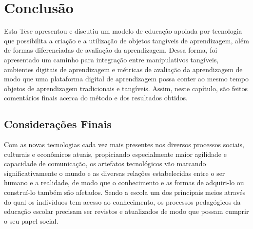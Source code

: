 
\chapter{Conclusão} \label{Chap:endFuture}


Esta Tese apresentou e discutiu um modelo de educação apoiada por tecnologia que possibilita a criação e a utilização de objetos tangíveis de aprendizagem, além de formas diferenciadas de avaliação da aprendizagem. 
Dessa forma, foi apresentado um caminho para integração entre manipulativos tangíveis, ambientes digitais de aprendizagem e métricas de avaliação da aprendizagem de modo que uma plataforma digital de aprendizagem possa conter ao mesmo tempo objetos de aprendizagem tradicionais e tangíveis. Assim, neste capítulo, 
são feitos comentários finais acerca do método e dos resultados obtidos.

\section{Considerações Finais}



Com as novas tecnologias cada vez mais presentes nos diversos processos sociais, culturais e econômicos atuais, propiciando especialmente maior agilidade e capacidade de comunicação, os artefatos tecnológicos vão marcando significativamente o mundo e as diversas relações estabelecidas entre o ser humano e a realidade, de modo que o conhecimento e as formas de adquiri-lo ou construí-lo também são afetados. Sendo a escola um dos principais meios através do qual os indivíduos tem acesso ao conhecimento, os processos pedagógicos da educação escolar precisam ser revistos e atualizados de modo que possam cumprir o seu papel social.

